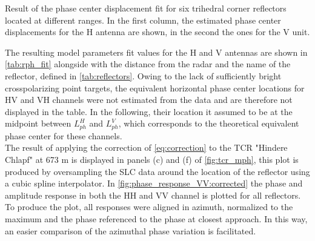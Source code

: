 \begin{table}[ht]
	\centering
	\caption{Result of the phase center displacement fit for six trihedral corner reflectors located at different ranges. In the first column, the estimated phase center displacements for the H antenna are shown, in the second the ones for the V unit.}
	\label{tab:rph_fit}
\end{table}
The resulting model parameters fit values for the H and V antennas are shown in \autoref{tab:rph_fit} alongside with the distance from the radar and the name of the reflector, defined in \autoref{tab:reflectors}. Owing to the lack of sufficiently bright crosspolarizing point targets, the equivalent horizontal phase center locations for HV and VH channels were not estimated from the data and are therefore not displayed in the table. In the following, their location it assumed to be at the midpoint between $L_{ph}^{H}$ and $L_{ph}^{V}$, which corresponds to the theoretical equivalent phase center for these channels.\\
The result of applying the correction of \autoref{eq:correction} to the TCR "Hindere Chlapf" at 673 m is displayed in panels (c) and (f) of \autoref{fig:tcr_mph}, this plot is produced by oversampling the SLC data around the location of the reflector using a cubic spline interpolator.
In \autoref{fig:phase_response_VV:corrected} the phase and amplitude response in both the HH and VV channel is plotted for all reflectors. To produce the plot, all responses were aligned in azimuth, normalized to the maximum and the phase referenced to the phase at closest approach. In this way, an easier comparison of the azimuthal phase variation is facilitated.



